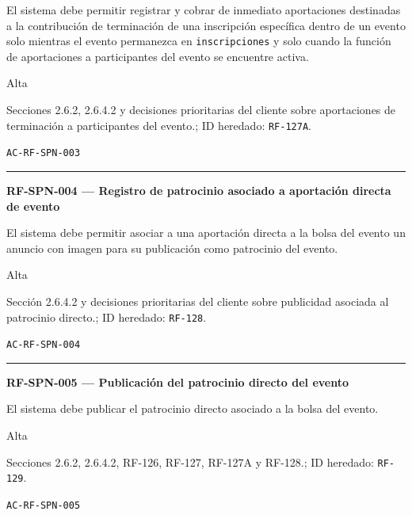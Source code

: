 \documentclass[10pt,letterpaper]{article}
\begin{document}
\begin{description}[style=nextline,leftmargin=3.15cm,labelwidth=2.8cm,font=\normalfont\bfseries]
\item[Obligación] El sistema debe permitir registrar y cobrar de inmediato aportaciones destinadas a la contribución de terminación de una inscripción específica dentro de un evento solo mientras el evento permanezca en \texttt{inscripciones} y solo cuando la función de aportaciones a participantes del evento se encuentre activa.
\item[Prioridad] Alta
\item[Procedencia] Secciones 2.6.2, 2.6.4.2 y decisiones prioritarias del cliente sobre aportaciones de terminación a participantes del evento.; ID heredado: \texttt{RF-127A}.
\item[Verificación] \texttt{AC-RF-SPN-003}
\end{description}
\vspace{0.25em}\hrule\vspace{0.65em}
\noindent\textbf{RF-SPN-004 --- Registro de patrocinio asociado a aportación directa de evento}\par
\begin{description}[style=nextline,leftmargin=3.15cm,labelwidth=2.8cm,font=\normalfont\bfseries]
\item[Obligación] El sistema debe permitir asociar a una aportación directa a la bolsa del evento un anuncio con imagen para su publicación como patrocinio del evento.
\item[Prioridad] Alta
\item[Procedencia] Sección 2.6.4.2 y decisiones prioritarias del cliente sobre publicidad asociada al patrocinio directo.; ID heredado: \texttt{RF-128}.
\item[Verificación] \texttt{AC-RF-SPN-004}
\end{description}
\vspace{0.25em}\hrule\vspace{0.65em}
\noindent\textbf{RF-SPN-005 --- Publicación del patrocinio directo del evento}\par
\begin{description}[style=nextline,leftmargin=3.15cm,labelwidth=2.8cm,font=\normalfont\bfseries]
\item[Obligación] El sistema debe publicar el patrocinio directo asociado a la bolsa del evento.
\item[Prioridad] Alta
\item[Procedencia] Secciones 2.6.2, 2.6.4.2, RF-126, RF-127, RF-127A y RF-128.; ID heredado: \texttt{RF-129}.
\item[Verificación] \texttt{AC-RF-SPN-005}
\end{description}
\end{document}
